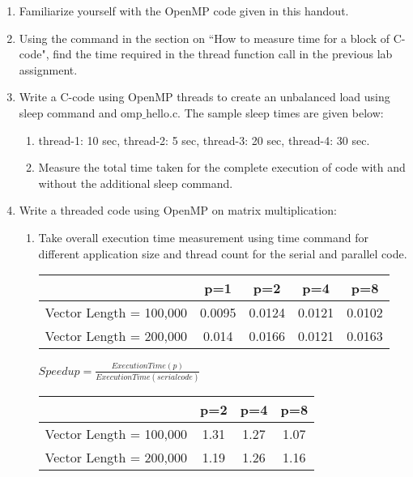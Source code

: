 \documentclass{sem5}
\author{Dilip Puri}
\begin{document}
\begin{enumerate}
\item Familiarize yourself with the OpenMP code given in this handout.
\begin{figure}[!htp]
\centering
\end{figure}
\item Using the command in the section on ``How to measure time for a block of C-code", find the time required in the thread function call in the previous lab assignment.\\

\item Write a C-code using OpenMP threads to create an unbalanced load using sleep command and omp$\_$hello.c. The sample sleep times are given below:
\begin{enumerate}
\item thread-1: 10 sec, thread-2: 5 sec, thread-3: 20 sec, thread-4: 30 sec.
\item Measure the total time taken for the complete execution of code with and without the additional sleep command.
\end{enumerate}

\item Write a threaded code using OpenMP on matrix multiplication:
\begin{enumerate}
\item Take overall execution time measurement using time command for different application size and thread count for the serial and parallel code.
\begin{center}
\begin{tabular}{|c|c|c|c|c|}
\hline
& p=1 & p=2 & p=4 & p=8\\
\hline
Vector Length = 100,000 & 0.0095 & 0.0124 & 0.0121 & 0.0102 \\
\hline
Vector Length = 200,000 & 0.014 & 0.0166 & 0.0121 & 0.0163 \\
\hline
\end{tabular}

$Speedup = \frac{Execution Time(p)}{Execution Time(serial code)}$\\
\vspace*{1cm}
\begin{tabular}{|c|c|c|c|}
\hline
 & p=2 & p=4 & p=8\\
\hline
Vector Length = 100,000 & 1.31 & 1.27 & 1.07 \\
\hline
Vector Length = 200,000 & 1.19 & 1.26 & 1.16 \\
\hline
\end{tabular}


\end{center}
\end{enumerate}
\end{enumerate}
\end{document}
